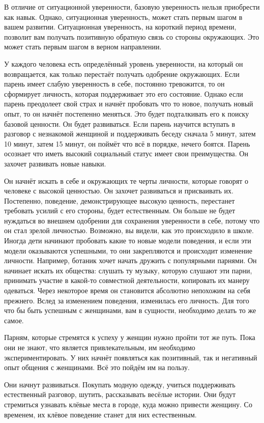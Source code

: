 В отличие от ситуационной уверенности, базовую уверенность нельзя приобрести как навык. Однако, ситуационная уверенность, может стать первым шагом в вашем развитии. Ситуационная уверенность, на короткий период времени, позволит вам получать позитивную обратную связь со стороны окружающих. Это может стать первым шагом в верном направлении.

У каждого человека есть определённый уровень уверенности, на который он возвращается, как только перестаёт получать одобрение окружающих. Если парень имеет слабую уверенность в себе, постоянно тревожится, то он сформирует личность, которая поддерживает это его состояние. Однако если парень преодолеет свой страх и начнёт пробовать что то новое, получать новый опыт, то он начнёт постепенно меняться. Это будет подталкивать его к поиску базовой ценности. Он будет развиваться. Если парень научится вступать в разговор с незнакомой женщиной и поддерживать беседу сначала 5 минут, затем 10 минут, затем 15 минут, он поймёт что всё в порядке, нечего боятся. Парень осознает что иметь высокий социальный статус имеет свои преимущества. Он захочет развивать новые навыки.

Он начнёт искать в себе и окружающих те черты личности, которые говорят о человеке с высокой ценностью. Он захочет развиваться и присваивать их. Постепенно, поведение, демонстрирующее высокую ценность, перестанет требовать усилий с его стороны, будет естественным. Он больше не будет нуждаться во внешнем одобрении для сохранения уверенности в себе, потому что он стал зрелой личностью. Возможно, вы видели, как это происходило в школе. Иногда дети начинают пробовать какие то новые модели поведения, и если эти модели оказываются успешными, то они закрепляются и происходит изменение личности. Например, ботаник хочет начать дружить с популярными парнями. Он начинает искать их общества: слушать ту музыку, которую слушают эти парни, принимать участие в какой-то совместной деятельности, копировать их манеру одеваться. Через некоторое время он становится абсолютно непохожим на себя прежнего. Вслед за изменением поведения, изменилась его личность. Для того что бы быть успешным с женщинами, вам в сущности, необходимо делать то же самое.

Парням, которые стремятся к успеху у женщин нужно пройти тот же путь. Пока они не знают, что является привлекательным, им необходимо экспериментировать. У них начнёт появляться как позитивный, так и негативный опыт общения с женщинами. Всё это пойдём им на пользу.

Они начнут развиваться. Покупать модную одежду, учиться поддерживать естественный разговор, шутить, рассказывать весёлые истории. Они будут стремиться узнавать клёвые места в городе, куда можно привести женщину. Со временем, их клёвое поведение станет для них естественным.


